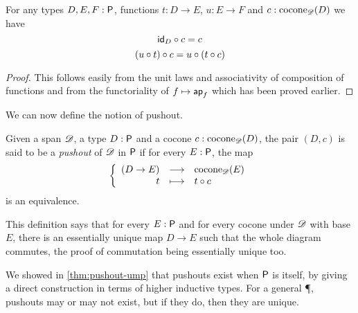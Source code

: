 \begin{lem}
  For any types $D,E,F:\P$, functions $t:D\to{}E$, $u:E\to{}F$ and
  $c:\cocone{\Ddiag}{D}$ we have
  \[\composecocone{\idfunc[D]}c = c\]
  \[\composecocone{(u\circ{}t)}c=\composecocone{u}(\composecocone{t}c)\]
\end{lem}
\begin{proof}
  This follows easily from the unit laws and associativity of composition of
  functions and from the functoriality of $f\mapsto{}\mapfunc{f}$ which has been proved
  earlier.
\end{proof}

We can now define the notion of pushout.

\begin{defn}
  Given a span $\Ddiag$, a type $D:\P$ and a cocone
  $c:\cocone{\Ddiag}{D}$, the pair $(D,c)$ is said to be a \emph{pushout}
  of $\Ddiag$ in $\P$ if for every $E:\P$, the map
  \[\function{(D\to{}E)}{\cocone{\Ddiag}{E}}{t}{\composecocone{t}c}\]
  is an equivalence.
\end{defn}

This definition says that for every $E:\P$ and for every cocone under $\Ddiag$
with base $E$, there is an essentially unique map $D\to{}E$ such that the whole
diagram commutes, the proof of commutation being essentially unique too.

We showed in \autoref{thm:pushout-ump} that pushouts exist when $\P$ is \type itself, by giving a direct construction in terms of higher
inductive types.
For a general \P, pushouts may or may not exist, but if they do, then they are unique.

